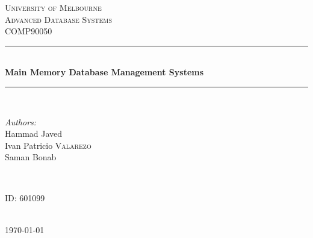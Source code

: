 \documentclass[12pt]{article} %
\begin{document}

\begin{titlepage}

\newcommand{\HRule}{\rule{\linewidth}{0.5mm}} %

\center %

\textsc{\LARGE University of Melbourne}\\[1.5cm] %
\textsc{\Large Advanced Database Systems}\\[0.5cm] %
\textsc{\large COMP90050}\\[0.5cm] %

\HRule \\[0.4cm]
{ \huge \bfseries Main Memory Database Management Systems}\\[0.4cm] %
\HRule \\[1.5cm]

\begin{minipage}{0.4\textwidth}
\begin{flushleft} \large
\emph{Authors:}\\
Hammad Javed\\
Ivan Patricio \textsc{Valarezo}\\ %
Saman Bonab\\
\end{flushleft}
\end{minipage}
~
\begin{minipage}{0.4\textwidth}
\begin{flushright} \large
ID: \textsc{601099} %
\end{flushright}
\end{minipage}\\[4cm]

{\large \today}\\[3cm] %


\vfill %

\end{titlepage}
\end{document}

